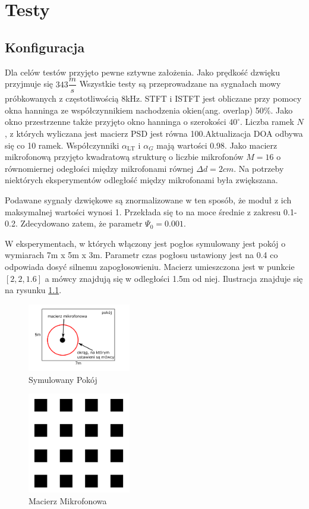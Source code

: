 \chapter{Testy}
\label{chapter-5}
\section{Konfiguracja}
Dla celów testów przyjęto pewne sztywne założenia. Jako prędkość dzwięku przyjmuje się $343 \dfrac{m}{s}$ Wszystkie testy są przeprowadzane na sygnałach mowy próbkowanych z częstotliwością 8kHz. STFT i ISTFT jest obliczane przy pomocy okna hanninga \cite{hann} ze współczynnikiem nachodzenia okien(ang. overlap) 50$\%$. Jako okno przestrzenne także przyjęto okno hanninga o szerokości $40^{\circ}$. Liczba ramek $N$, z których wyliczana jest macierz PSD jest równa 100.Aktualizacja DOA odbywa się co 10 ramek. Współczynniki $\alpha_{\mathrm{LT}}$ i $\alpha_{G}$ mają wartości 0.98. Jako macierz mikrofonową przyjęto kwadratową strukturę o liczbie mikrofonów $M=16$ o równomiernej odegłości między mikrofonami równej $\Delta d = 2cm$. Na potrzeby niektórych eksperymentów odległość między mikrofonami była zwiększana.

\noindent Podawane sygnały dzwiękowe są znormalizowane w ten sposób, że moduł z ich maksymalnej wartości wynosi 1. Przekłada się to na moce średnie z zakresu 0.1-0.2. Zdecydowano zatem, że parametr $\Psi_{0} = 0.001$. 

\noindent W eksperymentach, w których włączony jest pogłos symulowany jest pokój o wymiarach 7m x 5m x 3m. Parametr czas pogłosu ustawiony jest na 0.4 co odpowiada dosyć silnemu zapogłosowieniu. Macierz umieszczona jest w punkcie $[2,2,1.6]$ a mówcy znajdują się w odległości 1.5m od niej. Ilustracja znajduje się na rysunku \ref{fig:room}.

\begin{figure}[h!]
    \centering
    \includegraphics[width=0.4\textwidth]{Images/room.png}
    \caption{Symulowany Pokój}
    \label{fig:room}
\end{figure}

\begin{figure}[h!]
    \centering
    \includegraphics[width=0.4\textwidth]{Images/microphone.png}
    \caption{Macierz Mikrofonowa}
    \label{fig:microphone}
\end{figure}

